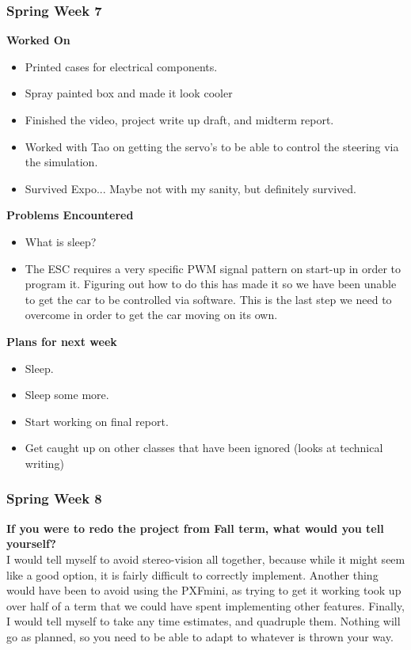 \documentclass[compsoc,draftclsnofoot,onecolumn,10pt]{IEEEtran}
\begin{document}
\subsubsection*{Spring Week 7}
\textbf{Worked On}
\begin{itemize}
    \item Printed cases for electrical components.
    \item Spray painted box and made it look cooler
    \item Finished the video, project write up draft, and midterm report.
    \item Worked with Tao on getting the servo's to be able to control the steering via the simulation.
    \item Survived Expo... Maybe not with my sanity, but definitely survived.
\end{itemize}
\textbf{Problems Encountered}
\begin{itemize}
    \item What is sleep?
    \item The ESC requires a very specific PWM signal pattern on start-up in order to program it.
    Figuring out how to do this has made it so we have been unable to get the car to be controlled via software.
    This is the last step we need to overcome in order to get the car moving on its own.
\end{itemize}
\textbf{Plans for next week}
\begin{itemize}
    \item Sleep.
    \item Sleep some more.
    \item Start working on final report.
    \item Get caught up on other classes that have been ignored (looks at technical writing)
\end{itemize}


\subsubsection*{Spring Week 8}
\textbf{If you were to redo the project from Fall term, what would you tell yourself?}\\
I would tell myself to avoid stereo-vision all together, because while it might seem like a good option, it is fairly difficult to correctly implement.
Another thing would have been to avoid using the PXFmini, as trying to get it working took up over half of a term that we could have spent implementing other features.
Finally, I would tell myself to take any time estimates, and quadruple them. Nothing will go as planned, so you need to be able to adapt to whatever is thrown your way.
\end{document}
